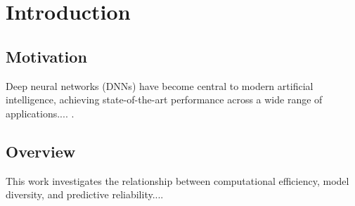 \chapter{Introduction}

\section{Motivation}

Deep neural networks (DNNs) have become central to modern artificial intelligence, achieving state-of-the-art performance across a wide range of applications.... \cite{goodfellow2016deep, bishop2006pattern}.

\section{Overview}

This work investigates the relationship between computational efficiency, model diversity, and predictive reliability....